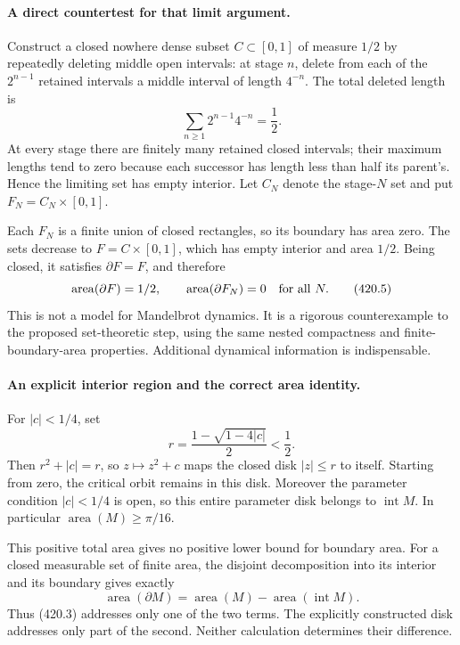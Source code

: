 \documentclass[11pt]{article}
\begin{document}
\paragraph{A direct countertest for that limit argument.}
Construct a closed nowhere dense subset $C\subset[0,1]$ of measure $1/2$ by repeatedly deleting middle open intervals: at stage $n$, delete from each of the $2^{n-1}$ retained intervals a middle interval of length $4^{-n}$. The total deleted length is
\[
 \sum_{n\ge1}2^{n-1}4^{-n}=\frac12.
\]
At every stage there are finitely many retained closed intervals; their maximum lengths tend to zero because each successor has length less than half its parent's. Hence the limiting set has empty interior. Let $C_N$ denote the stage-$N$ set and put $F_N=C_N\times[0,1]$.

Each $F_N$ is a finite union of closed rectangles, so its boundary has area zero. The sets decrease to $F=C\times[0,1]$, which has empty interior and area $1/2$. Being closed, it satisfies $\partial F=F$, and therefore
\[
 \operatorname{area}(\partial F)=1/2,
 \qquad \operatorname{area}(\partial F_N)=0\quad\hbox{for all }N.
 \tag{420.5}
\]
This is not a model for Mandelbrot dynamics. It is a rigorous counterexample to the proposed set-theoretic step, using the same nested compactness and finite-boundary-area properties. Additional dynamical information is indispensable.

\paragraph{An explicit interior region and the correct area identity.}
For $|c|<1/4$, set
\[
 r=\frac{1-\sqrt{1-4|c|}}2<\frac12.
\]
Then $r^2+|c|=r$, so $z\mapsto z^2+c$ maps the closed disk $|z|\le r$ to itself. Starting from zero, the critical orbit remains in this disk. Moreover the parameter condition $|c|<1/4$ is open, so this entire parameter disk belongs to $\operatorname{int}M$. In particular $\operatorname{area}(M)\ge\pi/16$.

This positive total area gives no positive lower bound for boundary area. For a closed measurable set of finite area, the disjoint decomposition into its interior and its boundary gives exactly
\[
 \operatorname{area}(\partial M)
 =\operatorname{area}(M)-\operatorname{area}(\operatorname{int}M).
 \tag{420.6}
\]
Thus (420.3) addresses only one of the two terms. The explicitly constructed disk addresses only part of the second. Neither calculation determines their difference.
\end{document}
